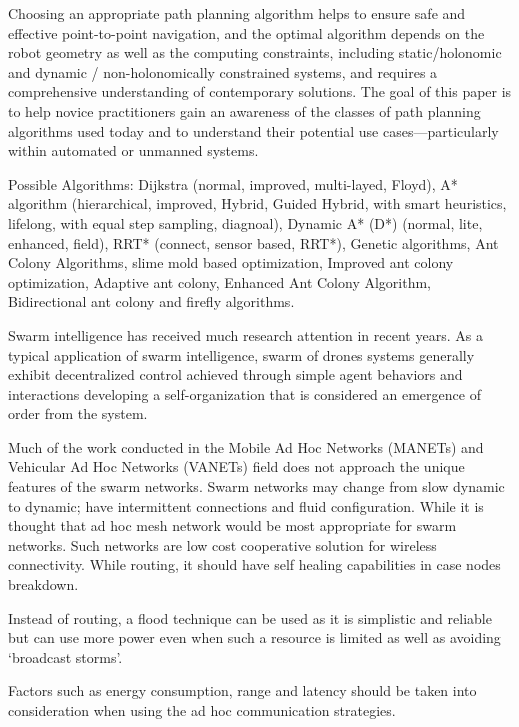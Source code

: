 \documentclass[conference]{IEEEtran}
\begin{document}
Choosing an appropriate path planning algorithm helps to ensure safe and effective point-to-point navigation, and the optimal algorithm depends on the robot geometry as well as the computing constraints, including static/holonomic and dynamic / non-holonomically constrained systems, and requires a comprehensive understanding of contemporary solutions. The goal of this paper is to help novice practitioners gain an awareness of the classes of path planning algorithms used today and to understand their potential use cases—particularly within automated or unmanned systems.

Possible Algorithms: Dijkstra (normal, improved, multi-layed, Floyd), A* algorithm (hierarchical, improved, Hybrid, Guided Hybrid, with smart heuristics, lifelong, with equal step sampling, diagnoal), Dynamic A* (D*) (normal, lite, enhanced, field), RRT* (connect, sensor based, RRT*), Genetic algorithms, Ant Colony Algorithms, slime mold based optimization, Improved ant colony optimization, Adaptive ant colony, Enhanced Ant Colony Algorithm, Bidirectional ant colony and firefly algorithms\cite{karur2021path}.




Swarm intelligence has received much research attention in recent years. As a typical application of swarm intelligence, swarm of drones systems generally exhibit decentralized control achieved through simple agent behaviors and interactions developing a self-organization that is considered an emergence of order from the system. 

Much of the work conducted in the Mobile Ad Hoc Networks (MANETs) and Vehicular Ad Hoc Networks (VANETs) field does not approach the unique features of the swarm networks. Swarm networks may change from slow dynamic to dynamic; have intermittent connections and fluid configuration. While it is thought that ad hoc mesh network would be most appropriate for swarm networks. Such networks are low cost cooperative solution for wireless connectivity. While routing, it should have self healing capabilities in case nodes breakdown.

Instead of routing, a flood technique can be used as it is simplistic and reliable but can use more power even when such a resource is limited as well as avoiding ‘broadcast storms’. 

Factors such as energy consumption, range and latency should be taken into consideration when using the ad hoc communication strategies\cite{cui2017brief}.
\end{document}
